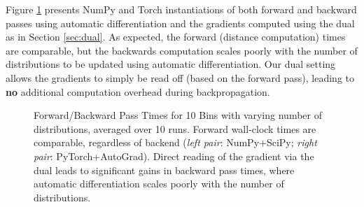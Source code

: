 Figure \ref{fig:speeds} presents NumPy and Torch instantiations of both forward and backward passes using automatic differentiation and the gradients computed using the dual as in Section \ref{sec:dual}. As expected, the forward (distance computation) times are comparable, but the backwards computation scales poorly with the number of distributions to be updated using automatic differentiation. Our dual setting allows the gradients to simply be read off (based on the forward pass), leading to \textbf{no} additional computation overhead during backpropagation.
\begin{figure}
    \centering
    \;
    \caption[DEMD forward and backward time copmarisons]{Forward/Backward Pass Times for 10 Bins with varying number of distributions, averaged over 10 runs. Forward wall-clock times are comparable, regardless of backend ({\em left pair}: NumPy+SciPy; {\em right pair}: PyTorch+AutoGrad). Direct reading of the gradient via the dual leads to significant gains in backward pass times, where automatic differentiation scales poorly with the number of distributions.}
    \label{fig:speeds}
\end{figure}


